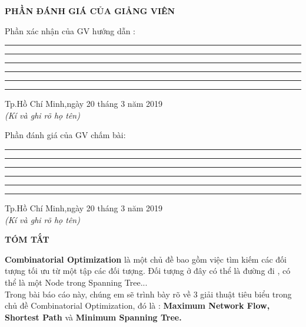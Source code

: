 \documentclass{article}
\begin{document}
\newpage
	\begin{center}
		\fontsize{16pt}{22pt}\selectfont
		\textbf{PHẦN ĐÁNH GIÁ CỦA GIẢNG VIÊN}
	\end{center}
	\bigskip
	\begin{flushleft}
		\fontsize{15pt}{22pt}\selectfont
		Phần xác nhận của GV hướng dẫn : \\
		\vspace{0.8cm}
		\rule[0.5cm]{15cm}{0.05cm}
		\rule[0.5cm]{15cm}{0.05cm}		
		\rule[0.5cm]{15cm}{0.05cm}
		\rule[0.5cm]{15cm}{0.05cm}
		\rule[0.5cm]{15cm}{0.05cm}
		\rule[0.5cm]{15cm}{0.05cm}
	\end{flushleft}
	\begin{flushleft}
		\fontsize{13pt}{22pt}\selectfont
		\hspace{7cm}
		Tp.Hồ Chí Minh,ngày 20 tháng 3 năm 2019\\
		\hspace{9cm}
		\textit{(Kí và ghi rõ họ tên)}
	\end{flushleft}
	\bigskip
	\begin{flushleft}
		\fontsize{15pt}{22pt}\selectfont
		Phần đánh giá của GV chấm bài: \\
		\vspace{0.8cm}
		\rule[0.5cm]{15cm}{0.05cm}
		\rule[0.5cm]{15cm}{0.05cm}		
		\rule[0.5cm]{15cm}{0.05cm}
		\rule[0.5cm]{15cm}{0.05cm}
		\rule[0.5cm]{15cm}{0.05cm}
		\rule[0.5cm]{15cm}{0.05cm}
	\end{flushleft}
	\begin{flushleft}
		\fontsize{13pt}{22pt}\selectfont
		\hspace{7cm}
		Tp.Hồ Chí Minh,ngày 20 tháng 3 năm 2019\\
		\hspace{9cm}
		\textit{(Kí và ghi rõ họ tên)}
	\end{flushleft}
\newpage
	\begin{center}
		\fontsize{16pt}{22pt}\selectfont
		\textbf{TÓM TẮT}
	\end{center}
	\bigskip
	\begin{flushleft}
		\fontsize{13pt}{18pt}\selectfont
		\hspace{0.86cm}
		\textbf{Combinatorial Optimization} là một chủ đề bao gồm việc tìm kiếm các đối tượng tối ưu từ một tập các đối tượng. Đối tượng ở đây có thể là đường đi , có thể là một Node trong Spanning Tree... \\
		\hspace{0.86cm}Trong bài báo cáo này, chúng em sẽ trình bày rõ về 3 giải thuật tiêu biểu trong chủ đề Combinatorial Optimization, đó là : \textbf{Maximum Network Flow, Shortest Path} và \textbf{Minimum Spanning Tree.}
	\end{flushleft}
\end{document}
